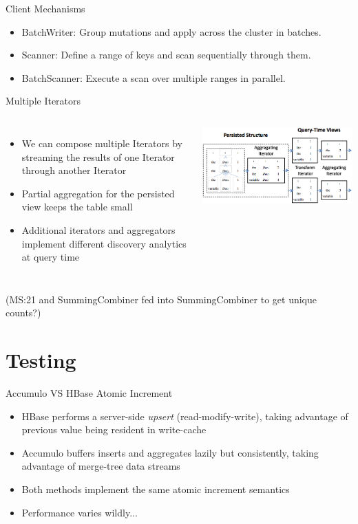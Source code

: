 \documentclass[t,landscape]{beamer}
\begin{document}
\begin{frame}{Client Mechanisms}
\begin{itemize}
\item{BatchWriter: Group mutations and apply across the cluster in batches.}
\item{Scanner: Define a range of keys and scan sequentially through them.}
\item{BatchScanner: Execute a scan over multiple ranges in parallel.}
\end{itemize}
\end{frame}

\begin{frame}{Multiple Iterators}
\begin{columns}
\tiny
\begin{itemize}
\item{We can compose multiple Iterators by streaming the results of one Iterator through another Iterator}
\item{Partial aggregation for the persisted view keeps the table small}
\item{Additional iterators and aggregators implement different discovery analytics at query time}
\end{itemize}
\begin{center}
\includegraphics[width=\textwidth]{images/aggregator_complex.png}
\end{center}
\end{columns}
(MS:21 and SummingCombiner fed into SummingCombiner to get unique counts?)
\end{frame}

\section{Testing}

\begin{frame}{Accumulo VS HBase Atomic Increment}
\begin{itemize}
\item{HBase performs a server-side \emph{upsert} (read-modify-write), taking advantage of previous value being resident in write-cache}
\item{Accumulo buffers inserts and aggregates lazily but consistently, taking advantage of merge-tree data streams}
\item{Both methods implement the same atomic increment semantics}
\item{Performance varies wildly...}
\end{itemize}
\end{frame}
\end{document}

